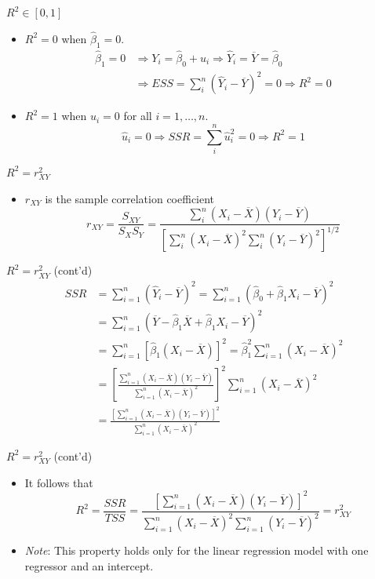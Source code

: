 \documentclass[presentation]{beamer}
\begin{document}
\begin{frame}[label={sec:orgbf9791f}]{\(R^2 \in [0, 1]\)}
\begin{itemize}
\item \(R^2 = 0\) when \(\hat{\beta}_1 = 0\).
\begin{align*}
\hat{\beta}_1 = 0 &\Rightarrow Y_i = \hat{\beta}_0 + \hat{u}_i
\Rightarrow \hat{Y}_i = \overline{Y} = \hat{\beta}_0 \\ 
&\Rightarrow ESS
= \sum_i^n (\hat{Y}_i - \overline{Y})^2 = 0 \Rightarrow R^2 = 0
\end{align*}
\item \(R^2 = 1\) when \(\hat{u}_i = 0\) for all \(i = 1, \ldots, n\).
\[ \hat{u}_i = 0 \Rightarrow SSR = \sum_i^n \hat{u}_i^2 = 0
  \Rightarrow R^2 = 1 \]
\end{itemize}
\end{frame}

\begin{frame}[label={sec:org7ed1d49}]{\(R^2 = r^2_{XY}\)}
\begin{itemize}
\item \(r_{XY}\) is the sample correlation coefficient
\[ r_{XY} = \frac{S_{XY}}{S_X S_Y} = \frac{\sum_i^n(X_i -
  \overline{X})(Y_i - \overline{Y})}{\left[\sum_i^n (X_i - \overline{X})^2 \sum_i^n (Y_i -
  \overline{Y})^2 \right]^{1/2}} \]
\end{itemize}
\end{frame}

\begin{frame}[label={sec:orgcbbc088}]{\(R^2 = r^2_{XY}\) (cont'd)}
\begin{align*}
SSR &= \sum_{i=1}^n (\hat{Y}_i - \overline{Y})^2 = \sum_{i=1}^n (\hat{\beta}_0 + \hat{\beta}_1 X_i - \overline{Y})^2 \\
&= \sum_{i=1}^n (\overline{Y} - \hat{\beta}_1 \overline{X} + \hat{\beta}_1 X_i - \overline{Y})^2 \\
&= \sum_{i=1}^n \left[ \hat{\beta}_1 (X_i - \overline{X}) \right]^2 = \hat{\beta}_1^2 \sum_{i=1}^n (X_i - \overline{X})^2 \\
&= \left[\frac{\sum_{i=1}^n (X_i - \overline{X})(Y_i - \overline{Y})}{\sum_{i=1}^n (X_i - \overline{X})^2}\right]^2 \sum_{i=1}^n (X_i - \overline{X})^2 \\
&= \frac{\left[ \sum_{i=1}^n (X_i - \overline{X})(Y_i - \overline{Y}) \right]^2}{\sum_{i=1}^n (X_i - \overline{X})^2}
\end{align*}
\end{frame}

\begin{frame}[label={sec:org3871bef}]{\(R^2 = r^2_{XY}\) (cont'd)}
\begin{itemize}
\item It follows that
\[
  R^2 = \frac{SSR}{TSS} = \frac{\left[ \sum_{i=1}^n (X_i - \overline{X})(Y_i - \overline{Y}) \right]^2}{\sum_{i=1}^n (X_i - \overline{X})^2 \sum_{i=1}^n (Y_i - \overline{Y})^2} = r^2_{XY}
  \]

\item \emph{Note}: This property holds only for the linear regression model
with \alert{one regressor and an intercept}.
\end{itemize}
\end{frame}
\end{document}
